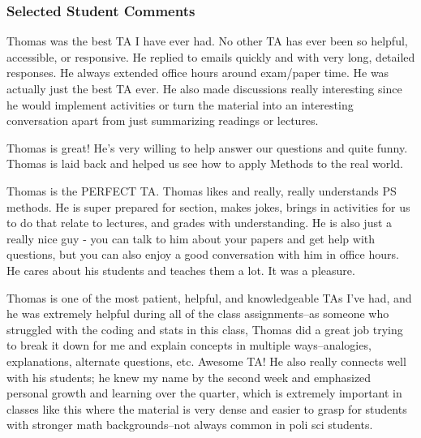 \documentclass[12pt]{article}
\begin{document}
\subsubsection*{Selected Student Comments}
\begin{itemize*}
\item Thomas was the best TA I have ever had. No other TA has ever been so helpful, accessible, or responsive. He replied to emails quickly and with very long, detailed responses. He always extended office hours around exam/paper time. He was actually just the best TA ever. He also made discussions really interesting since he would implement activities or turn the material into an interesting conversation apart from just summarizing readings or lectures.
\item Thomas is great! He's very willing to help answer our questions and quite funny. Thomas is laid back and helped us see how to apply Methods to the real world.
\item Thomas is the PERFECT TA. Thomas likes and really, really understands PS methods. He is super prepared for section, makes jokes, brings in activities for us to do that relate to lectures, and grades with understanding. He is also just a really nice guy - you can talk to him about your papers and get help with questions, but you can also enjoy a good conversation with him in office hours. He cares about his students and teaches them a lot. It was a pleasure.
\item Thomas is one of the most patient, helpful, and knowledgeable TAs I've had, and he was extremely helpful during all of the class assignments--as someone who struggled with the coding and stats in this class, Thomas did a great job trying to break it down for me and explain concepts in multiple ways--analogies, explanations, alternate questions, etc. Awesome TA! He also really connects well with his students; he knew my name by the second week and emphasized personal growth and learning over the quarter, which is extremely important in classes like this where the material is very dense and easier to grasp for students with stronger math backgrounds--not always common in poli sci students. %
\end{itemize*}
\end{document}
